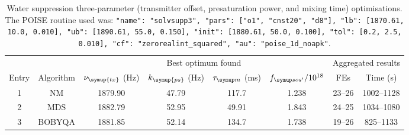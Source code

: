 \begin{table}
    \centering
    \begin{tabular}{cccccccc}
        \toprule
              &           & \multicolumn{4}{c}{Best optimum found} & \multicolumn{2}{c}{Aggregated results} \\
                            \cmidrule(lr){3-6}                       \cmidrule(lr){7-8}
        Entry & Algorithm & $\nu_{\symup{tx}}$ (\unit{\Hz}) & $k_{\symup{ps}}$ (\unit{\Hz}) & $\taum$ (\unit{\ms}) & $\fsosre / 10^{18}$ & FEs    & Time (\unit{\s}) \\
        \midrule
        1     & NM        & 1879.90                    & 47.79          & 117.7              & 1.238                    & 23--26 & 1002--1128     \\
        2     & MDS       & 1882.79                    & 52.95          & 49.91              & 1.843                    & 24--25 & 1034--1080     \\
        3     & BOBYQA    & 1881.85                    & 52.14          & 134.7              & 1.738                    & 19--26 & 825--1133      \\
        \bottomrule
    \end{tabular}
    \caption[Water suppression three-parameter optimisations]{
        Water suppression three-parameter (transmitter offset, presaturation power, and mixing time) optimisations.
        The POISE routine used was: \texttt{{"name": "solvsupp3", "pars": ["o1", "cnst20", "d8"], "lb": [1870.61, 10.0, 0.010], "ub": [1890.61, 55.0, 0.150], "init": [1880.61, 50.0, 0.100], "tol": [0.2, 2.5, 0.010], "cf": "zerorealint_squared", "au": "poise_1d_noapk"}}.
    }
    \label{tbl:poise_solvsupp3p}
\end{table}

